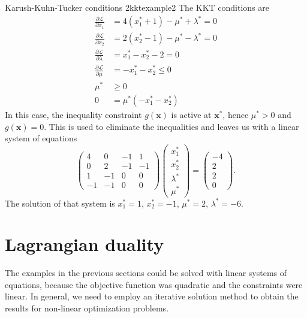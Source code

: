 \begin{example}{Karush-Kuhn-Tucker conditions 2}{kktexample2}
    The KKT conditions are 
    \begin{align}
        \frac{\partial \mathcal{\mathcal{L}}}{\partial x_1} &= 4 (x_1^* + 1) - \mu^* + \lambda^*  = 0\\
        \frac{\partial \mathcal{\mathcal{L}}}{\partial x_2} &= 2 (x_2^* - 1) - \mu^* - \lambda^*  = 0\\
        \frac{\partial \mathcal{\mathcal{L}}}{\partial \lambda} &= x_1^* - x_2^* - 2 = 0 \\
        \label{eq:kkt_example2_in}
        \frac{\partial \mathcal{\mathcal{L}}}{\partial \mu} &= -x_1^*-x_2^* \le 0 \\
        \mu^* &\ge 0 \\
        0 &= \mu^*(-x_1^*-x_2^*)
        \label{eq:kkt_example2_comp}
    \end{align}
    In this case, the inequality constraint $g(\mathbf{x})$ is active at $\mathbf{x}^*$, hence $\mu^* > 0$ and $g(\mathbf{x})=0$. This is used to eliminate the inequalities and leaves us with a linear system of equations 
    \begin{equation}
        \begin{pmatrix}
        4  & 0  & -1 & 1  \\
        0  & 2  & -1 & -1 \\ 
        1  & -1 & 0  & 0  \\
        -1 & -1 & 0  & 0
        \end{pmatrix} 
        \begin{pmatrix}
        x_1^* \\ x_2^* \\ \lambda^* \\ \mu^*  
        \end{pmatrix} 
        = 
        \begin{pmatrix}
        -4 \\ 2 \\ 2\\ 0
        \end{pmatrix} 
        .
    \end{equation}
    The solution of that system is $x_1^*=1$, $x_2^*=-1$, $\mu^*=2$, $\lambda^*=-6$.
\end{example}

\section{Lagrangian duality}
The examples in the previous sections could be solved with linear systems of equations, because the objective function was quadratic and the constraints were linear. In general, we need to employ an iterative solution method to obtain the results for non-linear optimization problems. 

